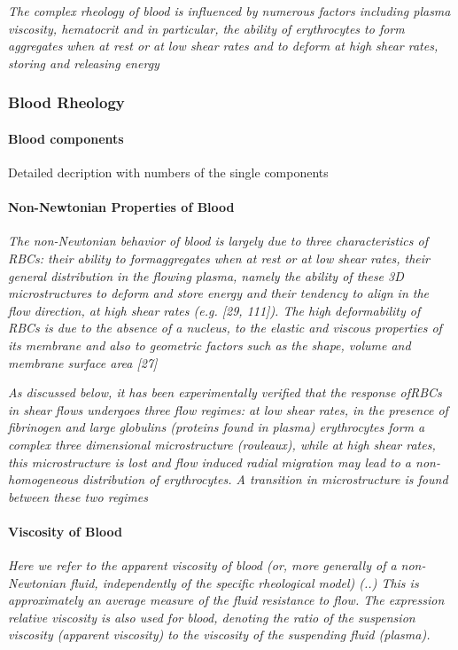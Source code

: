 \documentclass[11pt,letterpaper]{article}
\begin{document}
\textit{The complex rheology of blood is influenced by numerous factors including plasma viscosity, hematocrit and in particular, the ability of erythrocytes to form aggregates when at rest or at low shear rates and to deform at high shear rates, storing and releasing energy}

\subsubsection*{Blood Rheology}

\paragraph{Blood components}

Detailed decription with numbers of the single components

\paragraph{Non-Newtonian Properties of Blood}
\textit{The non-Newtonian behavior of blood is largely due to three characteristics of RBCs: their ability to formaggregates when at rest or at low shear rates, their general distribution in the flowing plasma, namely the ability of these 3D microstructures to deform and store energy and their tendency to align in the flow direction, at high shear rates (e.g. [29, 111]). The high deformability of RBCs is due to the absence of a nucleus, to the elastic and viscous properties of its membrane and also to geometric factors such as the shape, volume and membrane surface area [27]}

\textit{As discussed below, it has been experimentally verified that the response ofRBCs
in shear flows undergoes three flow regimes: at low shear rates, in the presence of fibrinogen and large globulins (proteins found in plasma) erythrocytes form a complex three dimensional microstructure (rouleaux), while at high shear rates, this microstructure is lost and flow induced radial migration may lead to a non- homogeneous distribution of erythrocytes. A transition in microstructure is found between these two regimes}

\paragraph{Viscosity of Blood} \textit{Here we refer to the apparent viscosity of blood (or, more generally of a non- Newtonian fluid, independently of the specific rheological model) (..) This is approximately an average measure of the fluid resistance to flow. The expression relative viscosity is also used for blood, denoting the ratio of the suspension viscosity (apparent viscosity) to the viscosity of the suspending fluid (plasma).}
\end{document}
